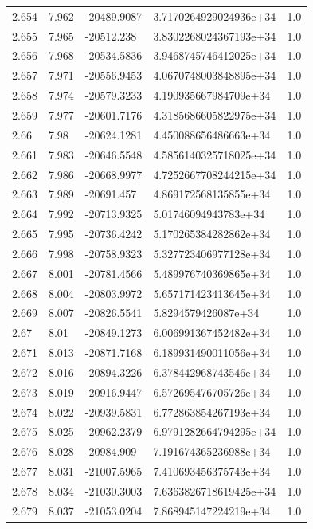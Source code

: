 \begin{tabular}{lllll}
2.654 & 7.962 & -20489.9087 & 3.7170264929024936e+34 & 1.0 \\
2.655 & 7.965 & -20512.238 & 3.8302268024367193e+34 & 1.0 \\
2.656 & 7.968 & -20534.5836 & 3.9468745746412025e+34 & 1.0 \\
2.657 & 7.971 & -20556.9453 & 4.0670748003848895e+34 & 1.0 \\
2.658 & 7.974 & -20579.3233 & 4.190935667984709e+34 & 1.0 \\
2.659 & 7.977 & -20601.7176 & 4.3185686605822975e+34 & 1.0 \\
2.66 & 7.98 & -20624.1281 & 4.450088656486663e+34 & 1.0 \\
2.661 & 7.983 & -20646.5548 & 4.5856140325718025e+34 & 1.0 \\
2.662 & 7.986 & -20668.9977 & 4.7252667708244215e+34 & 1.0 \\
2.663 & 7.989 & -20691.457 & 4.869172568135855e+34 & 1.0 \\
2.664 & 7.992 & -20713.9325 & 5.01746094943783e+34 & 1.0 \\
2.665 & 7.995 & -20736.4242 & 5.170265384282862e+34 & 1.0 \\
2.666 & 7.998 & -20758.9323 & 5.327723406977128e+34 & 1.0 \\
2.667 & 8.001 & -20781.4566 & 5.489976740369865e+34 & 1.0 \\
2.668 & 8.004 & -20803.9972 & 5.657171423413645e+34 & 1.0 \\
2.669 & 8.007 & -20826.5541 & 5.8294579426087e+34 & 1.0 \\
2.67 & 8.01 & -20849.1273 & 6.006991367452482e+34 & 1.0 \\
2.671 & 8.013 & -20871.7168 & 6.189931490011056e+34 & 1.0 \\
2.672 & 8.016 & -20894.3226 & 6.378442968743546e+34 & 1.0 \\
2.673 & 8.019 & -20916.9447 & 6.572695476705726e+34 & 1.0 \\
2.674 & 8.022 & -20939.5831 & 6.772863854267193e+34 & 1.0 \\
2.675 & 8.025 & -20962.2379 & 6.9791282664794295e+34 & 1.0 \\
2.676 & 8.028 & -20984.909 & 7.191674365236988e+34 & 1.0 \\
2.677 & 8.031 & -21007.5965 & 7.410693456375743e+34 & 1.0 \\
2.678 & 8.034 & -21030.3003 & 7.6363826718619425e+34 & 1.0 \\
2.679 & 8.037 & -21053.0204 & 7.868945147224219e+34 & 1.0 \\

\end{tabular}
